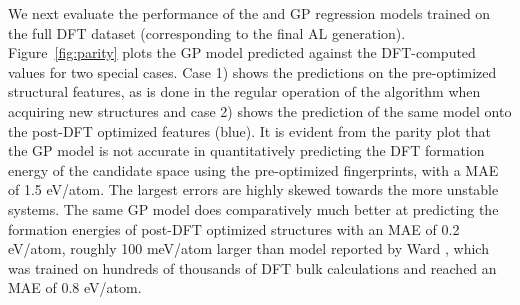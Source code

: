


We next evaluate the performance of the \IrOtwo and \IrOthree GP regression models trained on the full DFT dataset (corresponding to the final AL generation).
%
Figure~\ref{fig:parity} plots the GP model predicted \DHf against the DFT-computed values for two special cases.
%
Case 1) shows the predictions on the pre-optimized structural features, as is done in the regular operation of the algorithm when acquiring new structures and
case 2) shows the prediction of the same model onto the post-DFT optimized features (blue).
%
It is evident from the parity plot that the GP model is not accurate in quantitatively predicting the DFT formation energy of the candidate space using the pre-optimized fingerprints,
with a MAE of \mytilde\num{1.5} eV/atom.
%
The largest errors are highly skewed towards the more unstable systems.
%
The same GP model does comparatively much better at predicting the formation energies of post-DFT optimized structures with an MAE of \mytilde\num{0.2} eV/atom,
roughly 100 meV/atom larger than model reported by Ward , which was trained on hundreds of thousands of DFT bulk calculations and reached an MAE of 0.8 eV/atom.
%


